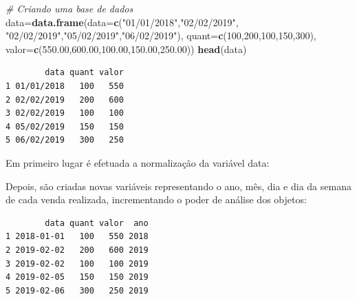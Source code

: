 \documentclass[12pt,brazil,oneside]{book}
\newenvironment{Shaded}{\begin{snugshade}}{\end{snugshade}}
\newcommand{\CommentTok}[1]{\textcolor[rgb]{0.56,0.35,0.01}{\textit{#1}}}
\newcommand{\DataTypeTok}[1]{\textcolor[rgb]{0.13,0.29,0.53}{#1}}
\newcommand{\DecValTok}[1]{\textcolor[rgb]{0.00,0.00,0.81}{#1}}
\newcommand{\FloatTok}[1]{\textcolor[rgb]{0.00,0.00,0.81}{#1}}
\newcommand{\KeywordTok}[1]{\textcolor[rgb]{0.13,0.29,0.53}{\textbf{#1}}}
\newcommand{\NormalTok}[1]{#1}
\newcommand{\OperatorTok}[1]{\textcolor[rgb]{0.81,0.36,0.00}{\textbf{#1}}}
\newcommand{\StringTok}[1]{\textcolor[rgb]{0.31,0.60,0.02}{#1}}
\begin{document}
\begin{Shaded}
\begin{Highlighting}[]
\CommentTok{# Criando uma base de dados}
\NormalTok{data=}\KeywordTok{data.frame}\NormalTok{(}\DataTypeTok{data=}\KeywordTok{c}\NormalTok{(}\StringTok{"01/01/2018"}\NormalTok{,}\StringTok{"02/02/2019"}\NormalTok{,}
                       \StringTok{"02/02/2019"}\NormalTok{,}\StringTok{"05/02/2019"}\NormalTok{,}\StringTok{"06/02/2019"}\NormalTok{),}
                \DataTypeTok{quant=}\KeywordTok{c}\NormalTok{(}\DecValTok{100}\NormalTok{,}\DecValTok{200}\NormalTok{,}\DecValTok{100}\NormalTok{,}\DecValTok{150}\NormalTok{,}\DecValTok{300}\NormalTok{),}
                \DataTypeTok{valor=}\KeywordTok{c}\NormalTok{(}\FloatTok{550.00}\NormalTok{,}\FloatTok{600.00}\NormalTok{,}\FloatTok{100.00}\NormalTok{,}\FloatTok{150.00}\NormalTok{,}\FloatTok{250.00}\NormalTok{))}
\KeywordTok{head}\NormalTok{(data)}
\end{Highlighting}
\end{Shaded}

\begin{verbatim}
        data quant valor
1 01/01/2018   100   550
2 02/02/2019   200   600
3 02/02/2019   100   100
4 05/02/2019   150   150
5 06/02/2019   300   250
\end{verbatim}

Em primeiro lugar é efetuada a normalização da variável data:

\begin{Shaded}
\end{Shaded}

Depois, são criadas novas variáveis representando o ano, mês, dia e dia da semana de cada venda realizada, incrementando o poder de análise dos objetos:

\begin{Shaded}
\end{Shaded}

\begin{verbatim}
        data quant valor  ano
1 2018-01-01   100   550 2018
2 2019-02-02   200   600 2019
3 2019-02-02   100   100 2019
4 2019-02-05   150   150 2019
5 2019-02-06   300   250 2019
\end{verbatim}
\end{document}
